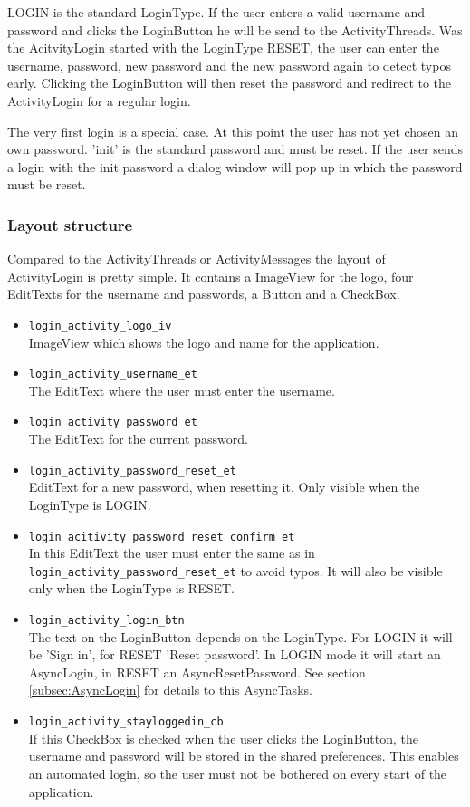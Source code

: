 \documentclass[12pt,a4paper,oneside]{report}
\newcommand{\code}[1]{\lstinline{#1}}
\begin{document}
LOGIN is the standard LoginType. If the user enters a valid username and password and clicks the LoginButton he will be send to the ActivityThreads. Was the AcitvityLogin started with the LoginType RESET, the user can enter the username, password, new password and the new password again to detect typos early. Clicking the LoginButton will then reset the password and redirect to the ActivityLogin for a regular login. 

The very first login is a special case. At this point the user has not yet chosen an own password. 'init' is the standard password and must be reset. If the user sends a login with the init password a dialog window will pop up in which the password must be reset. 

\subsubsection{Layout structure}
Compared to the ActivityThreads or ActivityMessages the layout of ActivityLogin is pretty simple. It contains a ImageView for the logo, four EditTexts for the username and passwords, a Button and a CheckBox.

\begin{itemize}
\item \code{login_activity_logo_iv}\\
ImageView which shows the logo and name for the application.

\item \code{login_activity_username_et}\\
The EditText where the user must enter the username.

\item \code{login_activity_password_et}\\
The EditText for the current password.

\item \code{login_activity_password_reset_et}\\
EditText for a new password, when resetting it. Only visible when the LoginType is LOGIN.

\item \code{login_acitivity_password_reset_confirm_et}\\
In this EditText the user must enter the same as in \code{login_activity_password_reset_et} to avoid typos. It will also be visible only when the LoginType is RESET.

\item \code{login_activity_login_btn}\\
The text on the LoginButton depends on the LoginType. For LOGIN it will be 'Sign in', for RESET 'Reset password'. In LOGIN mode it will start an AsyncLogin, in RESET an AsyncResetPassword. See section \ref{subsec:AsyncLogin} for details to this AsyncTasks.

\item \code{login_activity_stayloggedin_cb}\\
If this CheckBox is checked when the user clicks the LoginButton, the username and password will be stored in the shared preferences. This enables an automated login, so the user must not be bothered on every start of the application.
\end{itemize}
\end{document}
